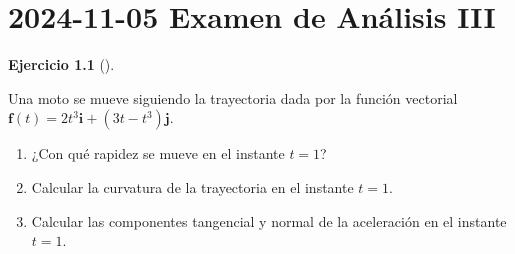 \documentclass[
  spanish,
  a4paper,
]{scrreport}
\theoremstyle{definition}
\newtheorem{exercise}{Ejercicio}[chapter]
\theoremstyle{remark}
\begin{document}

\chapter{\texorpdfstring{2024-11-05 Examen de Análisis
III}{2024-11-05  Examen de Análisis III}}\label{examen-de-anuxe1lisis-iii-2}

\begin{exercise}[]\protect\hypertarget{exr-1}{}\label{exr-1}

Una moto se mueve siguiendo la trayectoria dada por la función vectorial
\(\mathbf{f}(t)=2t^3 \mathbf{i} + (3t-t^3) \mathbf{j}\).

\begin{enumerate}
\def\labelenumi{\alph{enumi}.}
\item
  ¿Con qué rapidez se mueve en el instante \(t=1\)?
\item
  Calcular la curvatura de la trayectoria en el instante \(t=1\).
\item
  Calcular las componentes tangencial y normal de la aceleración en el
  instante \(t=1\).
\end{enumerate}

\end{exercise}
\end{document}
